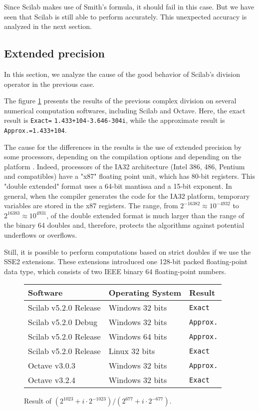 \documentclass{paper}
\newcommand{\scivar}[1]{\texttt{#1}}
\begin{document}
Since Scilab makes use of Smith's formula, it should fail in this 
case. 
But we have seen that Scilab is still able to perform accurately.
This unexpected accuracy is analyzed in the next section. 


\subsection{Extended precision}

In this section, we analyze the cause of the good behavior of 
Scilab's division operator in the previous case. 

The figure \ref{fig-compdiv-weird} presents the results of the 
previous complex division on several numerical computation softwares, 
including Scilab and Octave.
Here, the exact result is \scivar{Exact=} \scivar{1.433+104-3.646-304i}, 
while the approximate result is \scivar{Approx.=1.433+104}.

The cause for the differences in the results is the use of extended precision 
by some processors, depending on the compilation options and depending on the 
platform \cite{MullerEtAl2010,Monniaux2008}. 
Indeed, processors of the IA32 architecture (Intel 386, 486, Pentium and 
compatibles) have a "x87" floating point unit, which has 80-bit registers. 
This "double extended" format uses a 64-bit mantissa and a 15-bit exponent. 
In general, when the compiler generates the code for the IA32 platform, 
temporary variables are stored in the x87 registers. 
The range, from $2^{-16382}\approx 10^{-4932}$ to $2^{16383}\approx 10^{4931}$, 
of the double extended format is much larger than the range 
of the binary 64 doubles and, therefore, protects the algorithms against 
potential underflows or overflows. 

Still, it is possible to perform computations based on strict doubles if 
we use the SSE2 extensions. 
These extensions introduced one 128-bit packed floating-point 
data type, which consists of two IEEE binary 64 floating-point 
numbers. 

\begin{figure}
\caption{
Result of $(2^{1023}+i\cdot 2^{-1023})/(2^{677}+i\cdot 2^{-677})$.
}
\label{fig-compdiv-weird}
\begin{center}
\begin{tabular}{l|l|l}
\textbf{Software} & \textbf{Operating System} & \textbf{Result} \\
\hline
Scilab v5.2.0 Release & Windows 32 bits & \scivar{Exact} \\
Scilab v5.2.0 Debug   & Windows 32 bits & \scivar{Approx.} \\
Scilab v5.2.0 Release & Windows 64 bits & \scivar{Approx.} \\
Scilab v5.2.0 Release & Linux 32 bits   & \scivar{Exact} \\
Octave v3.0.3         & Windows 32 bits & \scivar{Approx.} \\
Octave v3.2.4         & Windows 32 bits & \scivar{Exact}
\end{tabular}
\end{center}
\end{figure}
\end{document}
